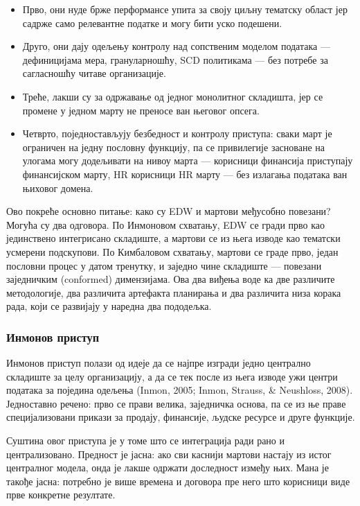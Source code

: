 \begin{itemize}
  \item Прво, они нуде брже перформансе упита за своју циљну тематску област јер садрже само релевантне податке и могу бити уско подешени.
  \item Друго, они дају одељењу контролу над сопственим моделом података — дефиницијама мера, грануларношћу, SCD политикама — без потребе за сагласношћу читаве организације.
  \item Треће, лакши су за одржавање од једног монолитног складишта, јер се промене у једном марту не преносе ван његовог опсега.
  \item Четврто, поједностављују безбедност и контролу приступа: сваки март је ограничен на једну пословну функцију, па се привилегије засноване на улогама могу додељивати на нивоу марта — корисници финансија приступају финансијском марту, HR корисници HR марту — без излагања података ван њиховог домена.
\end{itemize}
Ово покреће основно питање: како су EDW и мартови међусобно повезани? Могућа су два одговора. По Инмоновом схватању, EDW се гради прво као јединствено интегрисано складиште, а мартови се из њега изводе као тематски усмерени подскупови. По Кимбаловом схватању, мартови се граде прво, један пословни процес у датом тренутку, и заједно чине складиште — повезани заједничким (conformed) димензијама. Ова два виђења воде ка две различите методологије, два различита артефакта планирања и два различита низа корака рада, који се развијају у наредна два пододељка.

\subsubsection{Инмонов приступ}
Инмонов приступ полази од идеје да се најпре изгради једно централно складиште за целу организацију, а да се тек после из њега изводе ужи центри података за поједина одељења (Inmon, 2005; Inmon, Strauss, \& Neushloss, 2008). Једноставно речено: прво се прави велика, заједничка основа, па се из ње праве специјализовани прикази за продају, финансије, људске ресурсе и друге функције.

Суштина овог приступа је у томе што се интеграција ради рано и централизовано. Предност је јасна: ако сви каснији мартови настају из истог централног модела, онда је лакше одржати доследност између њих. Мана је такође јасна: потребно је више времена и договора пре него што корисници виде прве конкретне резултате.

